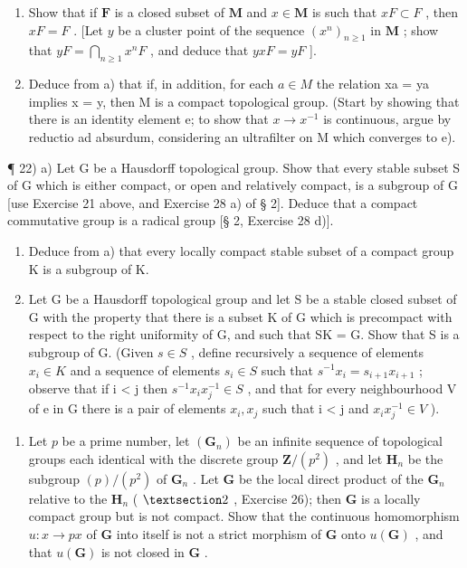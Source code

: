 \begin{enumerate}
\def\labelenumi{\alph{enumi})}
\item
  Show that if \(\mathbf{F}\) is a closed subset of \(\mathbf{M}\) and \(x \in \mathbf{M}\) is such that \(xF \subset F\) , then \(xF = F\) . {[}Let \(y\) be a cluster point of the sequence \((x^n)_{n \geqslant 1}\) in \(\mathbf{M}\) ; show that \(yF = \bigcap_{n \geqslant 1} x^n F\) , and deduce that \(yxF = yF\) {]}.
\item
  Deduce from a) that if, in addition, for each \(a \in M\) the relation xa = ya implies x = y, then M is a compact topological group. (Start by showing that there is an identity element e; to show that \(x \to x^{-1}\) is continuous, argue by reductio ad absurdum, considering an ultrafilter on M which converges to e).
\end{enumerate}

¶ 22) a) Let G be a Hausdorff topological group. Show that every stable subset S of G which is either compact, or open and relatively compact, is a subgroup of G {[}use Exercise 21 above, and Exercise 28 a) of § 2{]}. Deduce that a compact commutative group is a radical group {[}§ 2, Exercise 28 d){]}.

\begin{enumerate}
\def\labelenumi{\alph{enumi})}
\setcounter{enumi}{1}
\item
  Deduce from a) that every locally compact stable subset of a compact group K is a subgroup of K.
\item
  Let G be a Hausdorff topological group and let S be a stable closed subset of G with the property that there is a subset K of G which is precompact with respect to the right uniformity of G, and such that SK = G. Show that S is a subgroup of G. (Given \(s \in S\) , define recursively a sequence of elements \(x_{i} \in K\) and a sequence of elements \(s_{i} \in S\) such that \(s^{-1}x_{i} = s_{i+1}x_{i+1}\) ; observe that if i \textless{} j then \(s^{-1}x_{i}x^{-1}_{j} \in S\) , and that for every neighbourhood V of e in G there is a pair of elements \(x_{i}, x_{j}\) such that i \textless{} j and \(x_{i}x^{-1}_{j} \in V\) ).
\end{enumerate}

\begin{enumerate}
\def\labelenumi{\arabic{enumi})}
\setcounter{enumi}{22}
\tightlist
\item
  Let \(p\) be a prime number, let \((\mathbf{G}_n)\) be an infinite sequence of topological groups each identical with the discrete group \(\mathbf{Z}/(p^2)\) , and let \(\mathbf{H}_n\) be the subgroup \((p) / (p^2)\) of \(\mathbf{G}_n\) . Let \(\mathbf{G}\) be the local direct product of the \(\mathbf{G}_n\) relative to the \(\mathbf{H}_n\) ( \(\S 2\) , Exercise 26); then \(\mathbf{G}\) is a locally compact group but is not compact. Show that the continuous homomorphism \(u: x \to px\) of \(\mathbf{G}\) into itself is not a strict morphism of \(\mathbf{G}\) onto \(u(\mathbf{G})\) , and that \(u(\mathbf{G})\) is not closed in \(\mathbf{G}\) .
\end{enumerate}
\relax{}
